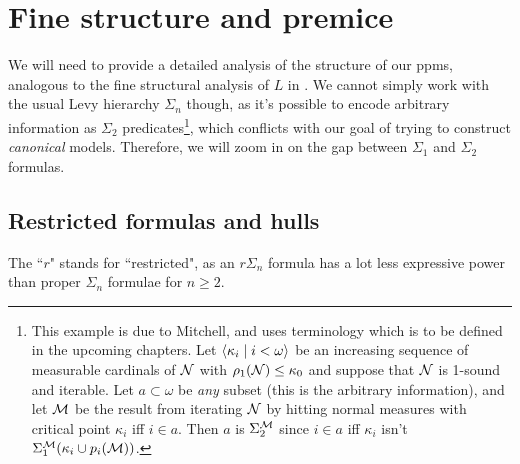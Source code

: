 \chapter{Fine structure and premice}
\thispagestyle{fancy}
\label{ch2}

We will need to provide a detailed analysis of the structure of our ppms, analogous to the fine structural analysis of $L$ in \cite{Jensen}. We cannot simply work with the usual Levy hierarchy $\Sigma_n$ though, as it's possible to encode arbitrary information as $\Sigma_2$ predicates\footnote{This example is due to Mitchell, and uses terminology which is to be defined in the upcoming chapters. Let $\langle \kappa_i\mid i<\omega\rangle$ be an increasing sequence of measurable cardinals of $\operatorname{\mathcal{N}}$ with $\rho_1(\operatorname{\mathcal{N}})\leq\kappa_0$ and suppose that $\operatorname{\mathcal{N}}$ is 1-sound and iterable. Let $a\subset\omega$ be \textit{any} subset (this is the arbitrary information), and let $\operatorname{\mathcal{M}}$ be the result from iterating $\operatorname{\mathcal{N}}$ by hitting normal measures with critical point $\kappa_i$ iff $i\in a$. Then $a$ is $\Sigma_2^{\operatorname{\mathcal{M}}}$ since $i\in a$ iff $\kappa_i$ isn't $\Sigma_1^{\operatorname{\mathcal{M}}}(\kappa_i\cup p_i(\operatorname{\mathcal{M}}))$.}, which conflicts with our goal of trying to construct \textit{canonical} models. Therefore, we will zoom in on the gap between $\Sigma_1$ and $\Sigma_2$ formulas.


\section{Restricted formulas and hulls}


The ``$r$" stands for ``restricted", as an $r\Sigma_n$ formula has a lot less expressive power than proper $\Sigma_n$ formulae for $n\geq 2$.


